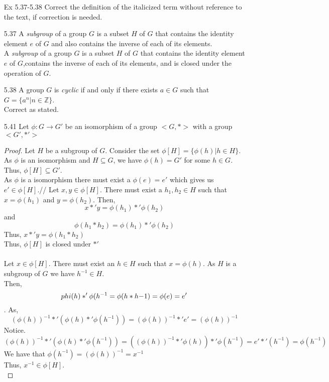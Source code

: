 \documentclass[12pt]{article}
\newcommand{\Z}{\mathds{Z}}
\begin{document}
\begin{enumerate}
		\item[Ex 5.37-5.38] Correct the definition of the italicized term without reference to the text, if correction is needed.
		\item[5.37] A \textit{subgroup} of a group $G$ is a subset $H$ of $G$ that contains the identity element $e$ of $G$ and also contains the inverse of each of its elements.\\
		A \textit{subgroup} of a group $G$ is a subset $H$ of $G$ that contains the identity element $e$ of $G$,contains the inverse of each of its elements, and is closed under the operation of $ G $.
		\item[5.38] A group $G$ is \textit{cyclic} if and only if there exists $a \in G$ such that $G = \{a^n|n\in\Z\}$.\\
		Correct as stated.
		\item[5.41] Let $\phi: G \rightarrow G'$ be an isomorphism of a group $<G, *>$ with a group $<G', *'>$
		\begin{proof}
			Let $ H $ be a subgroup of $ G $. Consider the set $ \phi[H]=\{\phi(h)|h\in H\} $. As $ \phi $ is an isomorphism and $ H \subseteq G $, we have $ \phi(h)=G' $ for some $ h\in G $. Thus, $ \phi[H] \subseteq G' $.\\
			As $ \phi $ is a isomorphism there must exist a $ \phi(e)=e' $ which gives us $ e' \in \phi[H] $.//
			Let $ x,y\in\phi[H] $. There must exist a $ h_1,h_2\in H $ such that $ x=\phi(h_1) $ and $ y=\phi(h_2) $. Then, 
				\[x*'y=\phi(h_1)*'\phi(h_2)\]
			and \[\phi(h_1*h_2)=\phi(h_1)*'\phi(h_2)\]
			Thus, $ x*'y=\phi(h_1*h_2) $\\
			Thus, $ \phi[H] $ is closed under $ *' $\\
			\\
			Let $ x\in\phi[H] $. There must exist an $ h\in H $ such that $ x=\phi(h) $. As $ H $ is a subgroup of $ G $ we have $ h^{-1}\in H $.\\
			Then, 
			\[\\phi(h)*'\phi(h^{-1}=\phi(h*h{-1})=\phi(e)=e'\].
			As,
				\[(\phi(h))^{-1}*'(\phi(h)*'\phi(h^{-1})) =(\phi(h))^{-1}*'e'=(\phi(h))^{-1}\]
			Notice.
				\[(\phi(h))^{-1}*'(\phi(h)*'\phi(h^{-1}))=((\phi(h))^{-1}*'\phi(h))*'\phi(h^{-1})=e'*'(h^{-1})=\phi(h^{-1})\]
			We have that $ \phi(h^{-1})=(\phi(h))^{-1}=x^{-1} $\\
			Thus, $ x^{-1}\in\phi[H]$.\\
			

\end{proof}
\end{enumerate}
\end{document}
